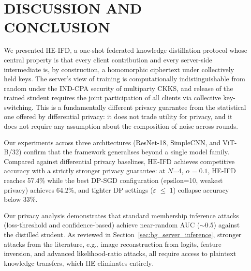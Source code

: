 \section{DISCUSSION AND CONCLUSION}
\label{sec:conclusion}

We presented HE-IFD, a one-shot federated knowledge distillation protocol whose central property is that every client contribution and every server-side intermediate is, by construction, a homomorphic ciphertext under collectively held keys. The server's view of training is computationally indistinguishable from random under the IND-CPA security of multiparty CKKS, and release of the trained student requires the joint participation of all clients via collective key-switching. This is a fundamentally different privacy guarantee from the statistical one offered by differential privacy: it does not trade utility for privacy, and it does not require any assumption about the composition of noise across rounds.




Our experiments across three architectures (ResNet-18, SimpleCNN, and ViT-B/32) confirm that the framework generalises beyond a single model family.
Compared against differential privacy baselines, HE-IFD achieves competitive accuracy with a strictly stronger privacy guarantee: at $N$=4, $\alpha=0.1$, HE-IFD reaches 57.4\% while the best DP-SGD configuration (epsilon=10, weakest privacy) achieves 64.2\%, and tighter DP settings ($\varepsilon$ $\leq$ 1) collapse accuracy below 33\%.

Our privacy analysis demonstrates that standard membership inference attacks (loss-threshold and confidence-based) achieve near-random AUC (${\sim}$0.5) against the distilled student. As reviewed in Section~\ref{sec:bg_server_inference}, stronger attacks from the literature, e.g., image reconstruction from logits, feature inversion, and advanced likelihood-ratio attacks, all require access to plaintext knowledge transfers, which HE eliminates entirely.


